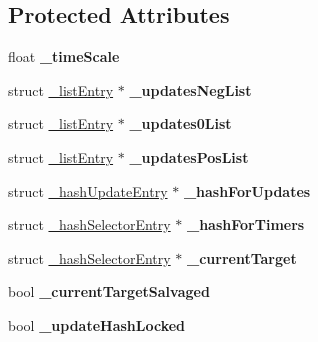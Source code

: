 \subsection*{Protected Attributes}
\begin{DoxyCompactItemize}
\item 
\mbox{\label{classScheduler_a8dde95d0e29d1638cc3d121830a12b83}} 
float {\bfseries \+\_\+time\+Scale}
\item 
\mbox{\label{classScheduler_a8887ae5d78aba7c6254815b724ec2e0e}} 
struct \hyperlink{struct__listEntry}{\+\_\+list\+Entry} $\ast$ {\bfseries \+\_\+updates\+Neg\+List}
\item 
\mbox{\label{classScheduler_a5f6e922997d57ecd58ced1b467c65f52}} 
struct \hyperlink{struct__listEntry}{\+\_\+list\+Entry} $\ast$ {\bfseries \+\_\+updates0\+List}
\item 
\mbox{\label{classScheduler_a6ba8963695f6b09483f58b46b4b84f57}} 
struct \hyperlink{struct__listEntry}{\+\_\+list\+Entry} $\ast$ {\bfseries \+\_\+updates\+Pos\+List}
\item 
\mbox{\label{classScheduler_a3ad610866d540c40d6f0a15ec2f55c4b}} 
struct \hyperlink{struct__hashUpdateEntry}{\+\_\+hash\+Update\+Entry} $\ast$ {\bfseries \+\_\+hash\+For\+Updates}
\item 
\mbox{\label{classScheduler_abc79758f16e4124d0b66f2adb5827e4c}} 
struct \hyperlink{struct__hashSelectorEntry}{\+\_\+hash\+Selector\+Entry} $\ast$ {\bfseries \+\_\+hash\+For\+Timers}
\item 
\mbox{\label{classScheduler_a7baf55db11c1ca73c7085605692021ef}} 
struct \hyperlink{struct__hashSelectorEntry}{\+\_\+hash\+Selector\+Entry} $\ast$ {\bfseries \+\_\+current\+Target}
\item 
\mbox{\label{classScheduler_aee3217f15a9dbe25d98d53607b2f7643}} 
bool {\bfseries \+\_\+current\+Target\+Salvaged}
\item 
\mbox{\label{classScheduler_ad9971f6f49f84fc8111fa0e7d56ed057}} 
bool {\bfseries \+\_\+update\+Hash\+Locked}
\item 

\end{DoxyCompactItemize}
